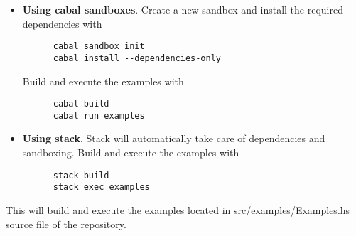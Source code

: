 \begin{itemize}
  \item \textbf{Using cabal sandboxes}. Create a new sandbox and install the
    required dependencies with

    \begin{verbatim}
      cabal sandbox init
      cabal install --dependencies-only
    \end{verbatim}

    Build and execute the examples with

    \begin{verbatim}
      cabal build
      cabal run examples
    \end{verbatim}

  \item \textbf{Using stack}. Stack will automatically take care of dependencies
    and sandboxing. Build and execute the examples with

    \begin{verbatim}
      stack build
      stack exec examples
    \end{verbatim}
\end{itemize}

This will build and execute the examples located in \href{https://github.com/%
GRACeFUL-project/GenericLibrary/blob/master/examples/%
Examples.hs}{src/examples/Examples.hs} source file of the repository.
